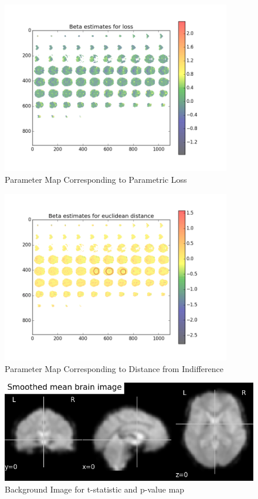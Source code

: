 \begin{figure}[h!]
\centering
\includegraphics[width=100mm]{images/parameter_map_loss.png}               
\caption{Parameter Map Corresponding to Parametric Loss}
\label{fig:beta2}
\end{figure}

\begin{figure}[h!]
\centering
\includegraphics[width=100mm]{images/parameter_map_dist.png}               
\caption{Parameter Map Corresponding to Distance from Indifference}
\label{fig:beta3}
\end{figure}

\begin{figure}[h!]
\centering
\includegraphics[width=120mm]{images/brain_template.png}               
\caption{Background Image for t-statistic and p-value map}
\label{fig:brain_temp}
\end{figure}

